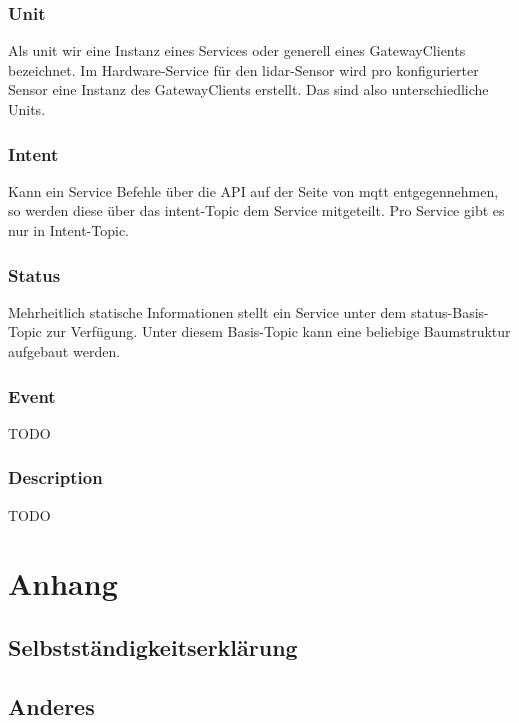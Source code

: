 \documentclass[11pt,english,german]{report}
\begin{document}
\subsection{Unit}
Als \gls{unit} wir eine Instanz eines Services oder generell eines GatewayClients bezeichnet. Im Hardware-Service für den \acrshort{lidar}-Sensor wird pro konfigurierter Sensor eine Instanz des GatewayClients erstellt. Das sind also unterschiedliche Units.
\subsection{Intent}
Kann ein Service Befehle über die API auf der Seite von \acrshort{mqtt} entgegennehmen, so werden diese über das \gls{intent}-Topic dem Service mitgeteilt. Pro Service gibt es nur in Intent-Topic.
\subsection{Status}
Mehrheitlich statische Informationen stellt ein Service unter dem \gls{status}-Basis-Topic zur Verfügung. Unter diesem Basis-Topic kann eine beliebige Baumstruktur aufgebaut werden.
\subsection{Event}
TODO
\subsection{Description}
TODO


\chapter{Anhang}
\section{Selbstständigkeitserklärung}
\section{Anderes}

\listoffigures

\end{document}
